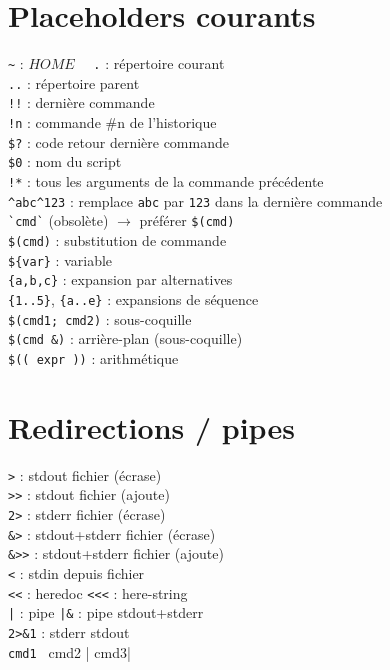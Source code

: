 \documentclass[10pt]{article}
\begin{document}
\begin{multicols}{4}
\section*{Placeholders courants}
\lstinline|~| : $HOME \quad$
\lstinline|.| : répertoire courant \\
\lstinline|..| : répertoire parent \\
\lstinline|!!| : dernière commande \\
\lstinline|!n| : commande \#n de l'historique \\
\lstinline|$?| : code retour dernière commande \\
\lstinline|$0| : nom du script \\
\lstinline|!*| : tous les arguments de la commande précédente \\
\lstinline|^abc^123| : remplace \lstinline|abc| par \lstinline|123| dans la dernière commande \\
\lstinline|`cmd`| (obsolète) \(\rightarrow\) préférer \lstinline|$(cmd)| \\
\lstinline|$(cmd)| : substitution de commande \\
\lstinline|${var}| : variable \\
\lstinline|{a,b,c}| : expansion par alternatives \\
\lstinline|{1..5}|, \lstinline|{a..e}| : expansions de séquence \\
\lstinline|$(cmd1; cmd2)| : sous-coquille \\
\lstinline|$(cmd &)| : arrière-plan (sous-coquille) \\
\lstinline|$(( expr ))| : arithmétique \\

\section*{Redirections / pipes}
\lstinline|>| : stdout \textrightarrow{} fichier (écrase) \\
\lstinline|>>| : stdout \textrightarrow{} fichier (ajoute) \\
\lstinline|2>| : stderr \textrightarrow{} fichier (écrase) \\
\lstinline|&>| : stdout+stderr \textrightarrow{} fichier (écrase) \\
\lstinline|&>>| : stdout+stderr \textrightarrow{} fichier (ajoute) \\
\lstinline|<| : stdin depuis fichier \\
\lstinline|<<| : heredoc \quad \lstinline|<<<| : here-string \\
\lstinline!|! : pipe \quad \lstinline!|&! : pipe stdout+stderr \\
\lstinline|2>&1| : stderr \textrightarrow{} stdout \\
\lstinline|cmd1 | cmd2 | cmd3| \\


\end{multicols}
\end{document}

